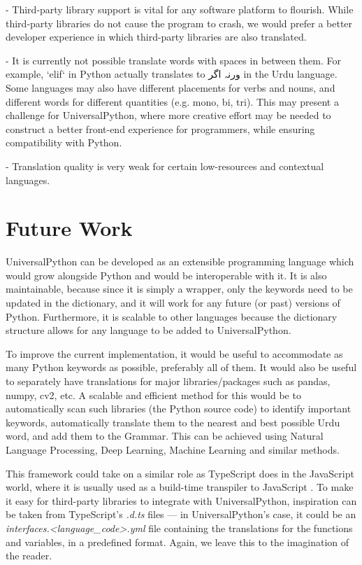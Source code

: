 \documentclass[conference]{IEEEtran}
\begin{document}
- Third-party library support is vital for any software platform to flourish. While third-party libraries do not cause the program to crash, we would prefer a better developer experience in which third-party libraries are also translated.

- It is currently not possible translate words with spaces in between them. For example, `elif` in Python actually translates to ورنہ اگر in the Urdu language. Some languages may also have different placements for verbs and nouns, and different words for different quantities (e.g. mono, bi, tri). This may present a challenge for UniversalPython, where more creative effort may be needed to construct a better front-end experience for programmers, while ensuring compatibility with Python.

- Translation quality is very weak for certain low-resources and contextual languages.


\section{Future Work}

UniversalPython can be developed as an extensible programming language which would grow alongside Python and would be interoperable with it. It is also maintainable, because since it is simply a wrapper, only the keywords need to be updated in the dictionary, and it will work for any future (or past) versions of Python. Furthermore, it is scalable to other languages because the dictionary structure allows for any language to be added to UniversalPython.

To improve the current implementation, it would be useful to accommodate as many Python keywords as possible, preferably all of them. It would also be useful to separately have translations for major libraries/packages such as pandas, numpy, cv2, etc. A scalable and efficient method for this would be to automatically scan such libraries (the Python source code) to identify important keywords, automatically translate them to the nearest and best possible Urdu word, and add them to the Grammar. This can be achieved using Natural Language Processing, Deep Learning, Machine Learning and similar methods.

This framework could take on a similar role as TypeScript does in the JavaScript world, where it is usually used as a build-time transpiler to JavaScript \cite{Understanding_TypeScript}. To make it easy for third-party libraries to integrate with UniversalPython, inspiration can be taken from TypeScript's {\em *.d.ts} files --- in UniversalPython's case, it could be an {\em interfaces.<language\_code>.yml} file containing the translations for the functions and variables, in a predefined format. Again, we leave this to the imagination of the reader.
\end{document}
